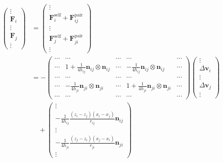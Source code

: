 \documentclass[12pt]{article}
\begin{document}
\begin{align}
\begin{pmatrix}
\vdots \\ \bm{F}_i \\ \vdots \\ \bm{F}_j \\  \vdots  
\end{pmatrix}
& =
\begin{pmatrix}
\vdots \\
\bm{F}_{i}^{\mathrm{self}} +  \bm{F}_{ij}^{\mathrm{pair}}  
\\ \vdots \\ 
\bm{F}_{j}^{\mathrm{self}} +  \bm{F}_{ji}^{\mathrm{pair}}  
\\  \vdots  
\end{pmatrix} \\
&=
-
\begin{pmatrix}
\cdots & \cdots & \cdots & \cdots & \cdots\\
\cdots & 1 + \frac{1}{4h_{ij}}\bm{n}_{ij} \otimes \bm{n}_{ij}  
& \cdots & -\frac{1}{4h_{ij}}\bm{n}_{ij} \otimes \bm{n}_{ij}   & \cdots\\
\cdots & \cdots & \cdots & \cdots & \cdots\\
\cdots & -\frac{1}{4h_{ji}}\bm{n}_{ji} \otimes \bm{n}_{ji} & \cdots 
& 1 + \frac{1}{4h_{ji}}\bm{n}_{ji} \otimes \bm{n}_{ji} 
 & \cdots \\
\cdots & \cdots & \cdots & \cdots & \cdots 
\end{pmatrix}
\begin{pmatrix}
\vdots \\
\Delta \bm{v}_i \\ 
\vdots \\
\Delta \bm{v}_j \\
\vdots 
\end{pmatrix} \\
& \quad 
+ 
\begin{pmatrix}
\vdots \\
-\frac{1}{4h_{ij}}
 \frac{(z_i - z_j )(x_i-x_j)}{r_{ij}} 
 \bm{n}_{ij} \\
\vdots \\
-\frac{1}{4h_{ji}} 
 \frac{(z_j - z_i )(x_j - x_i)}{r_{ji}} 
\bm{n}_{ji} \\
\vdots 
\end{pmatrix} 
\end{align}





\end{document}
